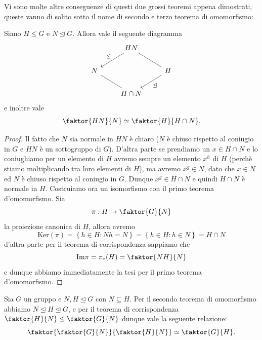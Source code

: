 \documentclass[11pt]{scrartcl}
\renewcommand{\ker}[1]{\text{Ker}\!\left(#1\right)}
\newcommand{\normal}{\mathrel{\unlhd}}
\begin{document}
	Vi sono molte altre conseguenze di questi due grossi teoremi appena dimostrati, queste vanno di solito sotto il nome di secondo e terzo teorema di omomorfismo:
	\begin{corollary}
		Siano $H\le G$ e $N\normal G$. Allora vale il seguente diagramma
		$$
		\begin{tikzcd}
			 & HN\arrow[dl,"\normal",swap] \arrow[dr,no head] & \\
			N&   						 	&H\arrow[ld,"\normal"] \\
			 &  H\cap N\arrow[no head,ul] 	&
		\end{tikzcd}
		$$
		e inoltre vale
		$$\faktor{HN}{N}\simeq \faktor{H}{H\cap N}.$$
	\end{corollary}
	\begin{proof}
		Il fatto che $N$ sia normale in $HN$ è chiaro ($N$ è chiuso rispetto al coniugio in $G$ e $HN$ è un sottogruppo di $G$). D'altra parte se prendiamo un $x\in H\cap N$ e lo coniughiamo per un elemento di $H$ avremo sempre un elemento $x^h$ di $H$ (perchè stiamo moltiplicando tra loro elementi di $H$), ma avremo $x^g\in N$, dato che $x\in N$ ed $N$ è chiuso rispetto al coniugio in $G$. Dunque $x^g\in H\cap N$ e quindi $H\cap N$ è normale in $H$. Costruiamo ora un isomorfismo con il primo teorema d'omomorfismo. Sia 
		$$\pi:H\to \faktor{G}{N}$$
		la proiezione canonica di $H$, allora avremo
		$$\ker{\pi} = \left\{h\in H:Nh=N\right\}=\left\{h\in H:h\in N\right\}=H\cap N$$
		d'altra parte per il teorema di corrispondenza sappiamo che 
		$$\text{Im}\pi=\pi_*(H)=\faktor{NH}{N}$$
		e dunque abbiamo immediatamente la tesi per il primo teorema d'omomorfismo.
	\end{proof}
	\begin{corollary}
		Sia $G$ un gruppo e $N, H \normal G$ con $N\subseteq H$.
		Per il secondo teorema di omomorfismo abbiamo $N \normal H\normal G$, e per il teorema di corrispondenza $\faktor{H}{N}\normal \faktor{G}{N}$ dunque vale la seguente relazione:
		$$\faktor{\faktor{G}{N}}{\faktor{H}{N}}\simeq \faktor{G}{H}.$$
	\end{corollary}
\end{document}
